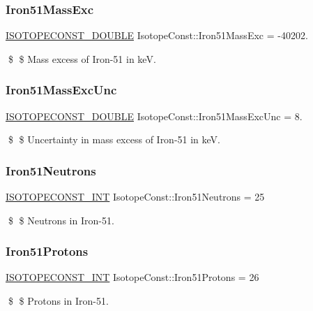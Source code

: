 \subsubsection{\texorpdfstring{Iron51\+Mass\+Exc}{Iron51MassExc}}
{\footnotesize\ttfamily \mbox{\hyperlink{group___isotope_const-_macros_ga8f45a7272ce02c0b4c65c44636ed719a}{I\+S\+O\+T\+O\+P\+E\+C\+O\+N\+S\+T\+\_\+\+D\+O\+U\+B\+LE}} Isotope\+Const\+::\+Iron51\+Mass\+Exc = -\/40202.}

\$ \$ Mass excess of Iron-\/51 in keV. \mbox{\label{group___isotope_const-_iron-_fe51_gabd668c74a2d609aeb34cffaeb7dbc3f2}} 
\subsubsection{\texorpdfstring{Iron51\+Mass\+Exc\+Unc}{Iron51MassExcUnc}}
{\footnotesize\ttfamily \mbox{\hyperlink{group___isotope_const-_macros_ga8f45a7272ce02c0b4c65c44636ed719a}{I\+S\+O\+T\+O\+P\+E\+C\+O\+N\+S\+T\+\_\+\+D\+O\+U\+B\+LE}} Isotope\+Const\+::\+Iron51\+Mass\+Exc\+Unc = 8.}

\$ \$ Uncertainty in mass excess of Iron-\/51 in keV. \mbox{\label{group___isotope_const-_iron-_fe51_ga0d34a4e4b2c6b727b670d92f0b6b5a10}} 
\subsubsection{\texorpdfstring{Iron51\+Neutrons}{Iron51Neutrons}}
{\footnotesize\ttfamily \mbox{\hyperlink{group___isotope_const-_macros_ga5f18360b3e99483a35c32d789e62621c}{I\+S\+O\+T\+O\+P\+E\+C\+O\+N\+S\+T\+\_\+\+I\+NT}} Isotope\+Const\+::\+Iron51\+Neutrons = 25}

\$ \$ Neutrons in Iron-\/51. \mbox{\label{group___isotope_const-_iron-_fe51_ga9130142223f6c0be6ca5f63eb5588fee}} 
\subsubsection{\texorpdfstring{Iron51\+Protons}{Iron51Protons}}
{\footnotesize\ttfamily \mbox{\hyperlink{group___isotope_const-_macros_ga5f18360b3e99483a35c32d789e62621c}{I\+S\+O\+T\+O\+P\+E\+C\+O\+N\+S\+T\+\_\+\+I\+NT}} Isotope\+Const\+::\+Iron51\+Protons = 26}

\$ \$ Protons in Iron-\/51. 